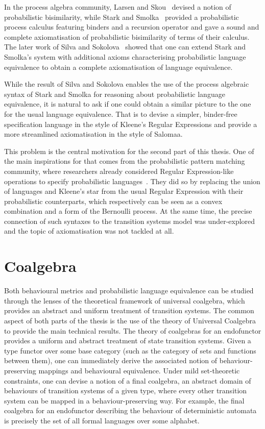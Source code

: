 In the process algebra community, Larsen and Skou~\cite{Larsen:1991:Bisimulation} devised a notion of probabilistic bisimilarity, while Stark and Smolka~\cite{Stark:2000:Complete} provided a probabilistic process calculus featuring binders and a recursion operator and gave a sound and complete axiomatisation of probabilistic bisimilarity of terms of their calculus. The later work of Silva and Sokolova~\cite{Silva:2011:Sound} showed that one can extend Stark and Smolka's system with additional axioms characterising probabilistic language equivalence to obtain a complete axiomatisation of language equivalence.

While the result of Silva and Sokolova enables the use of the process algebraic syntax of Stark and Smolka for reasoning about probabilistic language equivalence, it is natural to ask if one could obtain a similar picture to the one for the usual language equivalence. That is to devise a simpler, binder-free specification language in the style of Kleene's Regular Expressions and provide a more streamlined axiomatisation in the style of Salomaa.
	
	This problem is the central motivation for the second part of this thesis. One of the main inspirations for that comes from the probabilistic pattern matching community, where researchers already considered Regular Expression-like operations to specify probabilistic languages~\cite{Ross:2000:Probabilistic}. They did so by replacing the union of languages and Kleene's star from the usual Regular Expression with their probabilistic counterparts, which respectively can be seen as a convex combination and a form of the Bernoulli process. At the same time, the precise connection of such syntaxes to the transition systems model was under-explored~\cite{Beeh:2017:Transformations} and the topic of axiomatisation was not tackled at all. 


\section{Coalgebra}
Both behavioural metrics and probabilistic language equivalence can be studied through the lenses of the theoretical framework of universal coalgebra, which provides an abstract and uniform treatment of transition systems. 
The common aspect of both parts of the thesis is the use of the theory of Universal Coalgebra to provide the main technical results. The theory of coalgebras for an endofunctor provides a uniform and abstract treatment of state transition systems. Given a type functor over some base category (such as the category of sets and functions between them), one can immediately derive the associated notion of behaviour-preserving mappings and behavioural equivalence. Under mild set-theoretic constraints, one can devise a notion of a final coalgebra, an abstract domain of behaviours of transition systems of a given type, where every other transition system can be mapped in a behaviour-preserving way. For example, the final coalgebra for an endofunctor describing the behaviour of deterministic automata is precisely the set of all formal languages over some alphabet.

